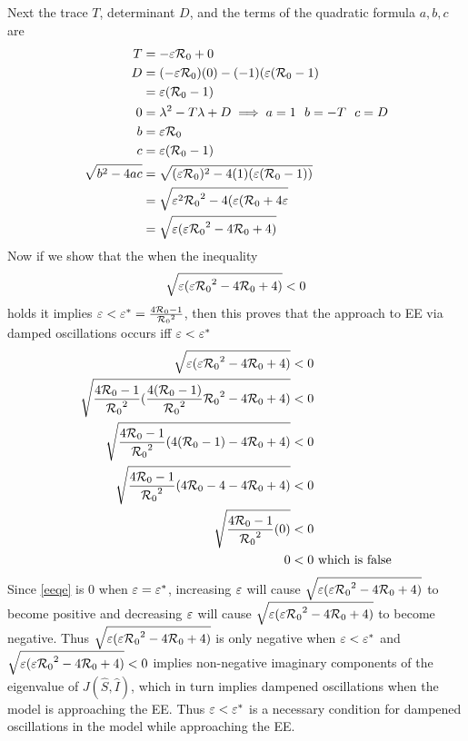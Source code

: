 Next the trace $T$, determinant $D$, and the terms of the quadratic formula $a,b,c$ are
\begin{align}
    T &= -\varepsilon {\mathcal R_0} + 0\\
    D &= (-\varepsilon {\mathcal R_0})(0) - (-1)(\varepsilon({\mathcal R_0}-1)\\
      &= \varepsilon({\mathcal R_0}-1)\\
    0 &= \lambda^2 - T \lambda + D \implies a = 1\ \ b = -T\ \ c = D\\
    b &= \varepsilon {\mathcal R_0}\\
    c &= \varepsilon({\mathcal R_0}-1)\\
    \sqrt{b^2-4ac} &= \sqrt{(\varepsilon {\mathcal R_0})^2 - 4(1)(\varepsilon({\mathcal R_0}-1))}\\
                   &= \sqrt{\varepsilon^2 {\mathcal R_0}^2 - 4(\varepsilon({\mathcal R_0}+4\varepsilon}\\
                   &= \sqrt{\varepsilon(\varepsilon{\mathcal R_0}^2 - 4{\mathcal R_0}+4)}\label{bsqr}
\end{align}
Now if we show that the when the inequality
\begin{equation}\label{eqee}
    \sqrt{\varepsilon(\varepsilon{\mathcal R_0}^2 - 4{\mathcal R_0}+4)} < 0
\end{equation}
holds it implies $\varepsilon < \varepsilon^* = \frac{4{\mathcal R_0}-1}{{\mathcal R_0}^2}$, then this proves that the approach to EE via damped oscillations occurs iff $\varepsilon < \varepsilon^*$
\begin{align}
    \sqrt{\varepsilon(\varepsilon{\mathcal R_0}^2 - 4{\mathcal R_0}+4)} &< 0\\
    \sqrt{\frac{4{\mathcal R_0}-1}{{\mathcal R_0}^2}(\frac{4({\mathcal R_0}-1)}{{\mathcal R_0}^2}{\mathcal R_0}^2 - 4{\mathcal R_0}+4)} &< 0\\
    \sqrt{\frac{4{\mathcal R_0}-1}{{\mathcal R_0}^2}(4({\mathcal R_0}-1) - 4{\mathcal R_0}+4)} &< 0\\
    \sqrt{\frac{4{\mathcal R_0}-1}{{\mathcal R_0}^2}(4{\mathcal R_0}-4 - 4{\mathcal R_0}+4)} &< 0\\
    \sqrt{\frac{4{\mathcal R_0}-1}{{\mathcal R_0}^2}(0)} &< 0\\
    0 &< 0\ \textrm{which is false}
\end{align}
Since \ref{eeqe} is 0 when $\varepsilon = \varepsilon^*$, increasing $\varepsilon$ will cause $\sqrt{\varepsilon(\varepsilon{\mathcal R_0}^2 - 4{\mathcal R_0}+4)}$ to become positive and decreasing $\varepsilon$ will cause $\sqrt{\varepsilon(\varepsilon{\mathcal R_0}^2 - 4{\mathcal R_0}+4)}$ to become negative.
Thus $\sqrt{\varepsilon(\varepsilon{\mathcal R_0}^2 - 4{\mathcal R_0}+4)}$ is only negative when $\varepsilon < \varepsilon^*$ and $\sqrt{\varepsilon(\varepsilon{\mathcal R_0}^2 - 4{\mathcal R_0}+4)} < 0$ implies non-negative imaginary components of the eigenvalue of $J(\hat{S},\hat{I})$, which in turn implies dampened oscillations when the model is approaching the EE.
Thus $\varepsilon < \varepsilon^*$ is a necessary condition for dampened oscillations in the model while approaching the EE.
